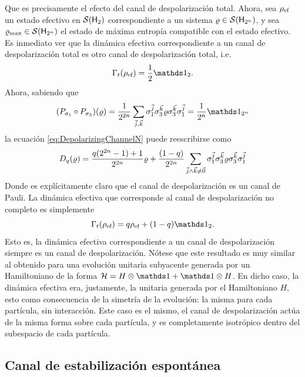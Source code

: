 Que es precisamente el efecto del canal de despolarización total. Ahora, sea $\rho_{\text{ef}}$ un estado efectivo en $\mathcal{S}({\sf H}_{2})$ correspondiente a un sistema $\varrho \in \mathcal{S}({\sf H}_{2^{n}})$, y sea $\varrho_{\max}\in\mathcal{S}({\sf H}_{2^{n}})$ el estado de máxima entropía compatible con el estado efectivo. Es inmediato ver que la dinámica efectiva correspondiente a un canal de despolarización total es otro canal de despolarización total, i.e.
\begin{equation}
    \Gamma_{t}(\rho_{\ef})=\frac{1}{2}\Id_{2}.
\end{equation}
Ahora, sabiendo que
\begin{equation}
    \qty(P_{\pauli{1}}\circ P_{\pauli{3}})(\varrho)=\frac{1}{2^{2n}}\sum_{\vec{j},\vec{k}}\pauli{1}^{\vec{j}}\pauli{3}^{\vec{k}}\varrho\pauli{3}^{\vec{k}}\pauli{1}^{\vec{j}}=\frac{1}{2^{n}}\Id_{2^{n}}\nonumber
\end{equation}
la ecuación \ref{eq:DepolarizingChannelN} puede reescribirse como
\begin{equation}
    D_{q}(\varrho)=\frac{q(2^{2n}-1)+1}{2^{2n}}\varrho+\frac{(1-q)}{2^{2n}}\sum_{\vec{j}\land\vec{k}\neq\vec{0}}\sigma_{1}^{\vec{j}}\sigma_{3}^{\vec{k}}\varrho\sigma_{3}^{\vec{k}}\sigma_{1}^{\vec{j}}\nonumber
\end{equation}
Donde es explícitamente claro que el canal de despolarización es un canal de Pauli. La dinámica efectiva que corresponde al canal de despolarización no completo es simplemente
\begin{equation}
    \Gamma_{t}(\rho_{\ef})=q\rho_{\ef}+(1-q)\Id_{2}.\nonumber
\end{equation}
Esto es, la dinámica efectiva correspondiente a un canal de despolarización siempre es un canal de despolarización. Nótese que este resultado es muy similar al obtenido para una evolución unitaria subyacente generada por un Hamiltoniano de la forma $\mcH=H\otimes\Id+\Id\otimes H$. En dicho caso, la dinámica efectiva era, justamente, la unitaria generada por el Hamiltoniano $H$, esto como consecuencia de la simetría de la evolución: la misma para cada partícula, sin interacción. Este caso es el mismo, el canal de despolarización actúa de la misma forma sobre cada partícula, y es completamente isotrópico dentro del subespacio de cada partícula.

\subsection{Canal de estabilización espontánea}

